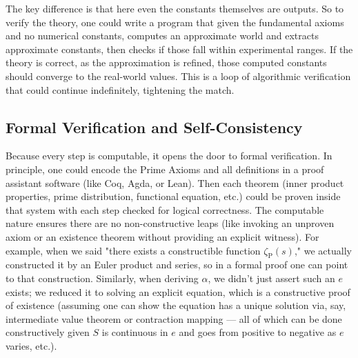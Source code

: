 \documentclass[11pt]{article}
\begin{document}
   The key difference is that here even the constants themselves are outputs. So to verify the theory, one could write a program that given the fundamental axioms and no numerical constants, computes an approximate world and extracts approximate constants, then checks if those fall within experimental ranges. If the theory is correct, as the approximation is refined, those computed constants should converge to the real-world values. This is a loop of algorithmic verification that could continue indefinitely, tightening the match.

\subsection*{Formal Verification and Self-Consistency}

Because every step is computable, it opens the door to formal verification. In principle, one could encode the Prime Axioms and all definitions in a proof assistant software (like Coq, Agda, or Lean). Then each theorem (inner product properties, prime distribution, functional equation, etc.) could be proven inside that system with each step checked for logical correctness. The computable nature ensures there are no non-constructive leaps (like invoking an unproven axiom or an existence theorem without providing an explicit witness). For example, when we said "there exists a constructible function $\zeta_{\mathrm{P}}(s)$," we actually constructed it by an Euler product and series, so in a formal proof one can point to that construction. Similarly, when deriving $\alpha$, we didn't just assert such an $e$ exists; we reduced it to solving an explicit equation, which is a constructive proof of existence (assuming one can show the equation has a unique solution via, say, intermediate value theorem or contraction mapping — all of which can be done constructively given $S$ is continuous in $e$ and goes from positive to negative as $e$ varies, etc.).
\end{document}
